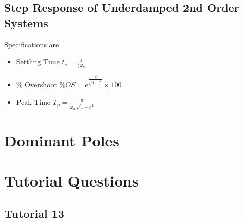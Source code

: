 \documentclass[oneside]{book}
\begin{document}
        \section{Step Response of Underdamped 2nd Order Systems}
            Specifications are 
            \begin{itemize}
                \item Settling Time
                    \subitem $t_s = \frac{4}{\zeta\omega_n}$
                \item \% Overshoot
                    \subitem $\%OS= e^{\frac{-\zeta\pi}{\sqrt{1 - \zeta^2}}}\times 100$
                \item Peak Time
                    \subitem $T_p = \frac{\pi}{\omega_n \sqrt{1 - \zeta^2}}$
            \end{itemize}
    \chapter{Dominant Poles}
    
    \chapter{Tutorial Questions}
        \section{Tutorial 13}
\end{document}
